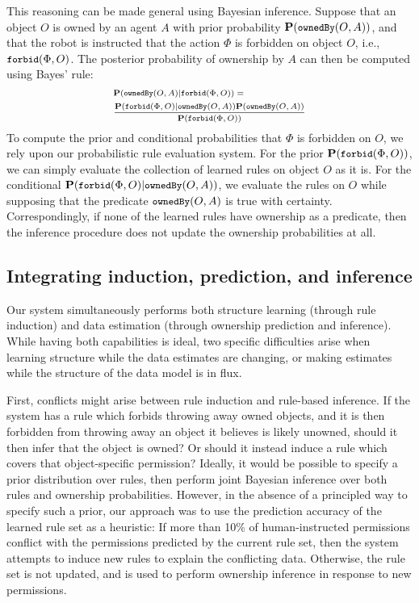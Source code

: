 \documentclass[letterpaper]{article} %
\begin{document}
This reasoning can be made general using Bayesian inference. Suppose that an object $O$ is owned by an agent $A$ with prior probability $\small{\mathbf{P}(\texttt{ownedBy}(O,A))}$, and that the robot is instructed that the action $\Phi$ is forbidden on object $O$, i.e., $\small{\texttt{forbid}(\Phi,O)}$. The posterior probability of ownership by $A$ can then be computed using Bayes' rule:
\begin{equation}
\begin{scriptsize}
\begin{aligned}
    &\mathbf{P}(\texttt{ownedBy}(O,A)|\texttt{forbid}(\Phi,O)) = \\
    &\frac{\mathbf{P}(\texttt{forbid}(\Phi,O)|\texttt{ownedBy}(O,A))\mathbf{P}(\texttt{ownedBy}(O,A))}{\mathbf{P}(\texttt{forbid}(\Phi,O))}
    \label{eq:RuleBasedInference}
\end{aligned}
\end{scriptsize}
\end{equation}
To compute the prior and conditional probabilities that $\Phi$ is forbidden on $O$, we rely upon our probabilistic rule evaluation system. For the prior $\small\mathbf{P}(\texttt{forbid}(\Phi,O))$, we can simply evaluate the collection of learned rules on object $O$ as it is. For the conditional $\small\mathbf{P}(\texttt{forbid}(\Phi,O)|\texttt{ownedBy}(O,A))$, we evaluate the rules on $O$ while supposing that the predicate $\small\texttt{ownedBy}(O,A)$ is true with certainty. Correspondingly, if none of the learned rules have ownership as a predicate, then the inference procedure does not update the ownership probabilities at all.

\subsection{Integrating induction, prediction, and inference}

Our system simultaneously performs both structure learning (through rule induction) and data estimation (through ownership prediction and inference). While having both capabilities is ideal, two specific difficulties arise when learning structure while the data estimates are changing, or making estimates while the structure of the data model is in flux. 

First, conflicts might arise between rule induction and rule-based inference. If the system has a rule which forbids throwing away owned objects, and it is then forbidden from throwing away an object it believes is likely unowned, should it then infer that the object is owned? Or should it instead induce a rule which covers that object-specific permission? Ideally, it would be possible to specify a prior distribution over rules, then perform joint Bayesian inference over both rules and ownership probabilities. However, in the absence of a principled way to specify such a prior, our approach was to use the prediction accuracy of the learned rule set as a heuristic: If more than 10\% of human-instructed permissions conflict with the permissions predicted by the current rule set, then the system attempts to induce new rules to explain the conflicting data. Otherwise, the rule set is not updated, and is used to perform ownership inference in response to new permissions.
\end{document}
